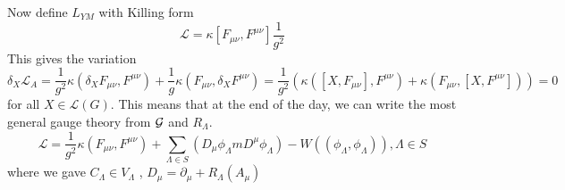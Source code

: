 Now define $ L _{ Y M } $ with Killing form 
\[
 \mathcal{ L }  = \kappa \left[  F _{ \mu \nu } , F ^{ \mu \nu }  \right]  \frac{1}{g ^  2} 
\] This gives the variation 
\[
 \delta _ X \mathcal{ L } _ A  = \frac{1}{g ^ 2 } 
 \kappa \left( \delta _ X F _{ \mu \nu } , F ^{ \mu \nu }  \right)  
 + \frac{1}{g } \kappa \left( F _{ \mu \nu } , \delta _ X F ^{ \mu \nu }  \right)  = \frac{1}{ g ^ 2 } \left( \kappa \left( \left[  X , F _{ \mu \nu }  \right]  , F ^{ \mu \nu }  \right)  + \kappa \left( F _{ \mu \nu } , 
 \left[  X , F ^{ \mu \nu }  \right] \right)   \right)   = 0
\]  for all $ X \in \mathcal{ L } \left( G   \right)  $. 
This means that at the end of the day, we 
can write the most general gauge theory
from $ \mathcal{ G } $ and $ R _{ \Lambda } $. 
\[
	\mathcal{ L }  = \frac{1}{g ^ 2 } \kappa \left( F _{ \mu \nu } , F ^{ \mu \nu }  \right) + \sum _{ \Lambda \in S } \left( D _ \mu \phi _{ \Lambda} m D ^ \mu \phi _{ \Lambda }  \right)   - W \left( \left( \phi _{ \Lambda } , 
	\phi _{ \Lambda} \right)   \right)  , \Lambda \in S 
\] where we gave $ C _{ \Lambda } \in V _{ \Lambda } $ , $ D _ \mu  = \partial  _ \mu + R _{ \Lambda } \left( A _\mu  \right)  $
\pagebreak 
